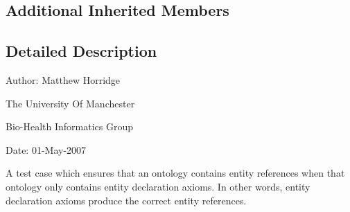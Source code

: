 \subsection*{Additional Inherited Members}


\subsection{Detailed Description}
Author\-: Matthew Horridge\par
 The University Of Manchester\par
 Bio-\/\-Health Informatics Group\par
 Date\-: 01-\/\-May-\/2007\par
 \par
 

A test case which ensures that an ontology contains entity references when that ontology only contains entity declaration axioms. In other words, entity declaration axioms produce the correct entity references. 

